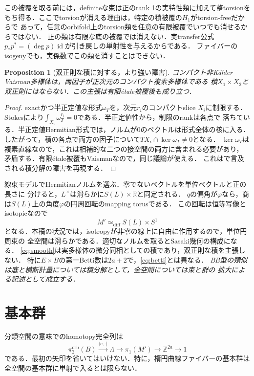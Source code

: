 \documentclass[12pt]{amsart}
\newtheorem{prop}[thm]{Proposition}
\theoremstyle{definition}
\theoremstyle{remark}
\numberwithin{equation}{section}
\DeclareMathOperator{\id}{id}
\newcommand{\orb}{\mathrm{orb}}
\newcommand{\R}{\mathbb{R}}
\newcommand{\Z}{\mathbb{Z}}
\newcommand{\wt}{\omega_{T}}
\begin{document}
この被覆を取る前には，definiteな束は正のrank 1の実特性類に加えて整torsionを
もち得る．ここでtorsionが消える理由は，特定の積被覆の$H_1$がtorsion-freeだからで
あって，任意のorbifold上のtorsion類を任意の有限被覆でいつでも消せるからではない．
正の類は有限な底の被覆では消えない．実transfer公式
$p_*p^*=(\deg p)\id$が引き戻しの単射性を与えるからである．
ファイバーのisogenyでも，実係数でこの類を消すことはできない．

\begin{prop}[双正則な積に対する，より強い障害]\label{prop:noproduct}
コンパクト非K\"ahler Vaisman多様体は，両因子が正次元のコンパクト複素多様体である
積$X_1\times X_2$と双正則にはならない．この主張は有限\'etale被覆後も成り立つ．
\end{prop}
\begin{proof}
exactかつ半正定値な形式$\wt$を，次元$r_i$のコンパクトslice $X_i$に制限する．
Stokesにより$\int_{X_i}\wt^{r_i}=0$である．半正定値性から，制限のrankは各点で
落ちている．半正定値Hermitian形式では，ノルムが0のベクトルは形式全体の核に入る．
したがって，積の各点で両方の因子について$TX_i\cap\ker\wt\ne0$となる．
$\ker\wt$は複素直線なので，これは相補的な二つの接空間の両方に含まれる必要があり，
矛盾する．有限\'etale被覆もVaismanなので，同じ議論が使える．
これは\cite[Introduction]{Istrati}で言及される積分解の障害を再現する．
\end{proof}

線束モデルでHermitianノルムを選ぶ．零でないベクトルを単位ベクトルと正の長さに
分けると，$L^{\times}$は滑らかに$S(L)\times\R$と同定される．
$q$の偏角が$\varphi$なら，商は$S(L)$上の角度$\varphi$の円周回転のmapping torusである．
この回転は恒等写像とisotopicなので
\begin{equation}\label{eq:smooth}
M'\simeq_{\mathrm{diff}}S(L)\times S^1
\end{equation}
となる．本稿の状況では，isotropyが非零の線上に自由に作用するので，単位円周束の
全空間は滑らかである．適切なノルムを取るとSasaki幾何の構成になる．
\eqref{eq:smooth}は実多様体の微分同相としての積であり，双正則な積を主張しない．
特に$E\times B$の第一Betti数は$2a+2$で，\eqref{eq:betti}とは異なる．
\emph{BB型の類似は底と横断計量については積分解として，全空間については束と群の
拡大による記述として成立する．}

\section{基本群}\label{sec:pi}
分類空間の意味でのhomotopy完全列は
\begin{equation}\label{eq:pi}
\pi_2^{\orb}(B)\xrightarrow{\langle c,\cdot\rangle}\Lambda
\longrightarrow\pi_1(M')\longrightarrow\Z^{2a}\longrightarrow1
\end{equation}
である．最初の矢印を省いてはいけない．特に，楕円曲線ファイバーの基本群は
全空間の基本群に単射で入るとは限らない．
\end{document}

